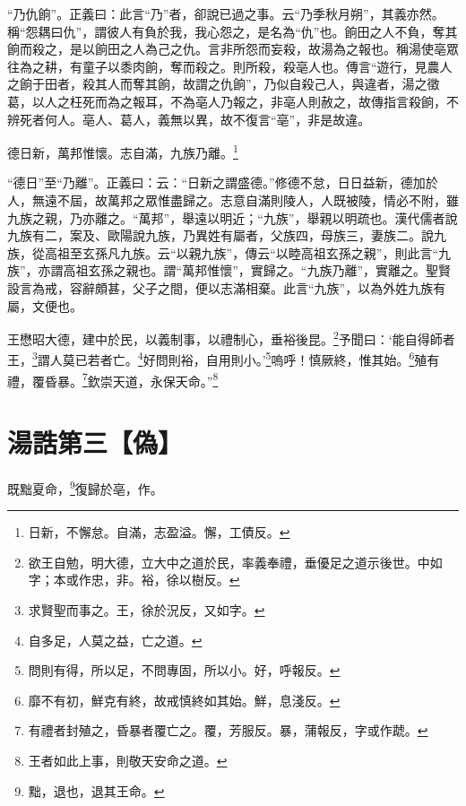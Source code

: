 {\noindent\shu{}\fzkt “乃仇餉”。正義曰：此言“乃”者，卻說已過之事。云“乃季秋月朔”，其義亦然。稱“怨耦曰仇”，謂彼人有負於我，我心怨之，是名為“仇”也。餉田之人不負，奪其餉而殺之，是以餉田之人為己之仇。言非所怨而妄殺，故湯為之報也。稱湯使亳眾往為之耕，有童子以黍肉餉，奪而殺之。則所殺，殺亳人也。傳言“遊行，見農人之餉于田者，殺其人而奪其餉，故謂之仇餉”，乃似自殺己人，與違者，湯之徵葛，以人之枉死而為之報耳，不為亳人乃報之，非亳人則赦之，故傳指言殺餉，不辨死者何人。亳人、葛人，義無以異，故不復言“亳”，非是故違。 \par}

德日新，萬邦惟懷。志自滿，九族乃離。\footnote{日新，不懈怠。自滿，志盈溢。懈，工債反。}

{\noindent\shu{}\fzkt “德日”至“乃離”。正義曰：云：“日新之謂盛德。”修德不怠，日日益新，德加於人，無遠不屆，故萬邦之眾惟盡歸之。志意自滿則陵人，人既被陵，情必不附，雖九族之親，乃亦離之。“萬邦”，舉遠以明近；“九族”，舉親以明疏也。漢代儒者說九族有二，案及、歐陽說九族，乃異姓有屬者，父族四，母族三，妻族二。說九族，從高祖至玄孫凡九族。云“以親九族”，傳云“以睦高祖玄孫之親”，則此言“九族”，亦謂高祖玄孫之親也。謂“萬邦惟懷”，實歸之。“九族乃離”，實離之。聖賢設言為戒，容辭頗甚，父子之間，便以志滿相棄。此言“九族”，以為外姓九族有屬，文便也。 \par}

王懋昭大德，建中於民，以義制事，以禮制心，垂裕後昆。\footnote{欲王自勉，明大德，立大中之道於民，率義奉禮，垂優足之道示後世。中如字；本或作忠，非。裕，徐以樹反。}予聞曰：‘能自得師者王，\footnote{求賢聖而事之。王，徐於況反，又如字。}謂人莫已若者亡。\footnote{自多足，人莫之益，亡之道。}好問則裕，自用則小。’\footnote{問則有得，所以足，不問專固，所以小。好，呼報反。}嗚呼！慎厥終，惟其始。\footnote{靡不有初，鮮克有終，故戒慎終如其始。鮮，息淺反。}殖有禮，覆昏暴。\footnote{有禮者封殖之，昏暴者覆亡之。覆，芳服反。暴，蒲報反，字或作虣。}欽崇天道，永保天命。”\footnote{王者如此上事，則敬天安命之道。}

\section{湯誥第三【偽】}

既黜夏命，\footnote{黜，退也，退其王命。}復歸於亳，作。

